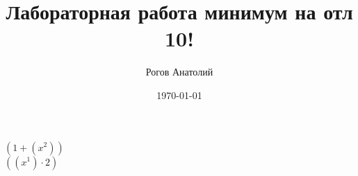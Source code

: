 \documentclass[12pt, letterpaper]{article}
\title{Лабораторная работа минимум на отл 10!}
\author{Рогов Анатолий}
\date{\today}
\begin{document}
\maketitle
\newpage
$({1}+{({x}^{2})})$\\
$({({x}^{1})}\cdot{2})$\\
\end{document}
